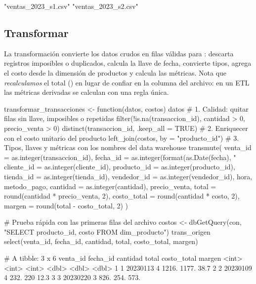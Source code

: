 \begin{rsalida}
[1] "ventas_2023_s1.csv" "ventas_2023_s2.csv"
\end{rsalida}

\subsection{Transformar}

La transformación convierte los datos crudos en filas válidas para
: descarta registros imposibles o duplicados, calcula
la llave de fecha, convierte tipos, agrega el costo desde la dimensión de
productos y calcula las métricas. Nota que \emph{recalculamos} el total
() en lugar de confiar en la columna del
archivo: en un ETL las métricas derivadas se calculan con una regla única.

\begin{rcode}
transformar_transacciones <- function(datos, costos) {
  datos %
    # 1. Calidad: quitar filas sin llave, imposibles o repetidas
    filter(!is.na(transaccion_id), cantidad > 0, precio_venta > 0) %
    distinct(transaccion_id, .keep_all = TRUE) %
    # 2. Enriquecer con el costo unitario del producto
    left_join(costos, by = "producto_id") %
    # 3. Tipos, llaves y métricas con los nombres del data warehouse
    transmute(
      venta_id    = as.integer(transaccion_id),
      fecha_id    = as.integer(format(as.Date(fecha), "%
      cliente_id  = as.integer(cliente_id),
      producto_id = as.integer(producto_id),
      tienda_id   = as.integer(tienda_id),
      vendedor_id = as.integer(vendedor_id),
      hora, metodo_pago,
      cantidad    = as.integer(cantidad),
      precio_venta,
      total       = round(cantidad * precio_venta, 2),
      costo_total = round(cantidad * costo, 2),
      margen      = round(total - costo_total, 2)
    )
}

# Prueba rápida con las primeras filas del archivo
costos <- dbGetQuery(con, "SELECT producto_id, costo FROM dim_producto")
trans_origen %
  select(venta_id, fecha_id, cantidad, total, costo_total, margen)
\end{rcode}

\begin{rsalida}
# A tibble: 3 x 6
  venta_id fecha_id cantidad total costo_total margen
     <int>    <int>    <int> <dbl>       <dbl>  <dbl>
1        1 20230113        4 1216.       1177.   38.7
2        2 20230109        4  232.        220    12.3
3        3 20230220        3  826.        254.  573. 
\end{rsalida}

